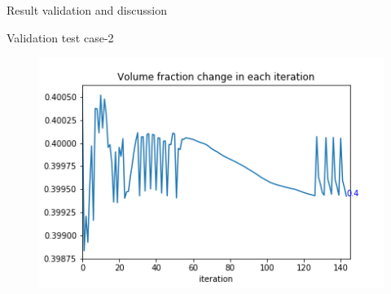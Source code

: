 \documentclass[a4paper,12pt,times]{article}
\begin{document}
\begin{section}{Result validation and discussion}
\begin{subsection}{Validation test case-2}
\begin{figure}[H]
\begin{minipage}{.5\textwidth}
		\label{VC-04.5}
	\end{minipage}%
	\begin{minipage}{.5\textwidth}
		\centering
		\includegraphics[width=1\linewidth]{OC_02_Volume_fractionVSiteration.png}
		\label{VC-04.6}
	\end{minipage}
\end{figure} 


\end{subsection}
\end{section}
\end{document}

